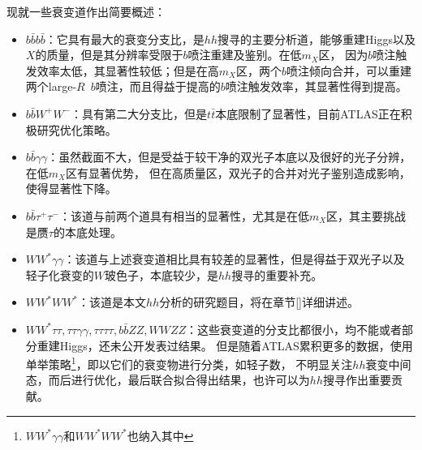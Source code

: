 现就一些衰变道作出简要概述：
\begin{itemize}
 \item $b\bar{b}b\bar{b}$：它具有最大的衰变分支比，是$hh$搜寻的主要分析道，能够重建Higgs以及$X$的质量，但是其分辨率受限于$b$喷注重建及鉴别。在低$m_X$区，
 因为$b$喷注触发效率太低，其显著性较低；但是在高$m_X$区，两个$b$喷注倾向合并，可以重建两个large-$R$~$b$喷注，而且得益于提高的$b$喷注触发效率，其显著性得到提高。
 \item $b\bar{b}W^{+}W^{-}$：具有第二大分支比，但是$t\bar{t}$本底限制了显著性，目前ATLAS正在积极研究优化策略。
 \item $b\bar{b}\gamma\gamma$：虽然截面不大，但是受益于较干净的双光子本底以及很好的光子分辨，在低$m_X$区有显著优势，
 但在高质量区，双光子的合并对光子鉴别造成影响，使得显著性下降。
 \item $b\bar{b}\tau^{+}\tau^{-}$：该道与前两个道具有相当的显著性，尤其是在低$m_X$区，其主要挑战是赝$\tau$的本底处理。
 \item $WW^{*}\gamma\gamma$：该道与上述衰变道相比具有较差的显著性，但是得益于双光子以及轻子化衰变的$W$玻色子，本底较少，是$hh$搜寻的重要补充。
 \item $WW^{*}WW^{*}$：该道是本文$hh$分析的研究题目，将在章节\ref{}详细讲述。
 \item $WW^{*}\tau\tau, \tau\tau\gamma\gamma, \tau\tau\tau\tau, b\bar{b}ZZ, WWZZ$：这些衰变道的分支比都很小，均不能或者部分重建Higgs，还未公开发表过结果。
 但是随着ATLAS累积更多的数据，使用单举策略\footnote{$WW^{*}\gamma\gamma$和$WW^{*}WW^{*}$也纳入其中}，即以它们的衰变物进行分类，如轻子数，
 不明显关注$hh$衰变中间态，而后进行优化，最后联合拟合得出结果，也许可以为$hh$搜寻作出重要贡献。
\end{itemize}
